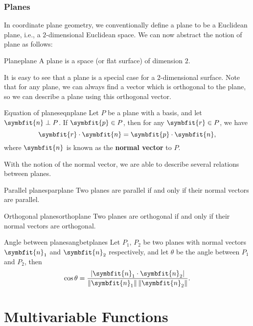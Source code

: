 \documentclass[math]{amznotes}
\theoremstyle{remark}
\begin{document}
\subsection{Planes}
In coordinate plane geometry, we conventionally define a plane to be a Euclidean plane, i.e., a $2$-dimensional Euclidean space. We can now abstract the notion of plane as follows:
\begin{dfnbox}{Plane}{plane}
    A plane is a space (or flat surface) of dimension $2$.
\end{dfnbox}
It is easy to see that a plane is a special case for a $2$-dimensional surface. Note that for any plane, we can always find a vector which is orthogonal to the plane, so we can describe a plane using this orthogonal vector.
\begin{thmbox}{Equation of planes}{eqnplane}
    Let $P$ be a plane with a basis, and let $\symbfit{n} \perp P$. If $\symbfit{p} \in P$, then for any $\symbfit{r} \in P$, we have
    \begin{equation*}
        \symbfit{r} \cdot \symbfit{n} = \symbfit{p} \cdot \symbfit{n},
    \end{equation*}
    where $\symbfit{n}$ is known as the {\color{red} \textbf{normal vector}} to $P$.
\end{thmbox}
With the notion of the normal vector, we are able to describe several relations between planes.
\begin{thmbox}{Parallel planes}{parplane}
    Two planes are parallel if and only if their normal vectors are parallel.
\end{thmbox}
\begin{thmbox}{Orthogonal planes}{orthoplane}
    Two planes are orthogonal if and only if their normal vectors are orthogonal.
\end{thmbox}
\begin{thmbox}{Angle between planes}{angbetplanes}
    Let $P_1$, $P_2$ be two planes with normal vectors $\symbfit{n}_1$ and $\symbfit{n}_2$ respectively, and let $\theta$ be the angle between $P_1$ and $P_2$, then
    \begin{equation*}
        \cos{\theta} = \frac{\left|\symbfit{n}_1 \cdot \symbfit{n}_2\right|}{\left\lVert \symbfit{n}_1 \right\rVert \left\lVert \symbfit{n}_2 \right\rVert}.
    \end{equation*}
\end{thmbox}
\chapter{Multivariable Functions}
\end{document}

